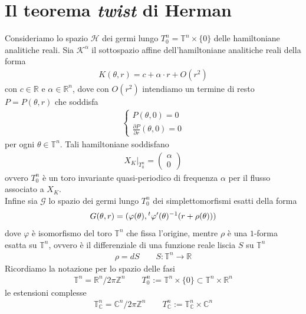 \documentclass[twoside, 11pt]{amsbook}
\newcommand{\0}{{(0)}}
\newcommand{\3}{{(3)}}
\theoremstyle{colonplain}
\theoremstyle{colondefinition}
\theoremstyle{colonremark}
\numberwithin{equation}{chapter}
\begin{document}
\section{Il teorema \textit{twist} di Herman}
Consideriamo lo spazio $\mathcal{H}$ dei germi lungo $T^n_0 = \mathbb{T}^n \times \{0\}$ delle hamiltoniane analitiche reali. Sia $\mathcal{K}^\alpha$ il sottospazio affine dell'hamiltoniane analitiche reali della forma
\begin{align}
    K(\theta, r) = c + \alpha \cdot r + O(r^2) 
\end{align}
con $c \in \mathbb{R}$ e $\alpha \in \mathbb{R}^n$, dove con $O(r^2)$ intendiamo un termine di resto $P = P(\theta, r)$ che soddisfa
\begin{align}
    \begin{cases}
        P(\theta, 0) = 0 \\
        \frac{\partial P}{\partial r}(\theta, 0) = 0
    \end{cases}
\end{align}
per ogni $\theta \in \mathbb{T}^n$. Tali hamiltoniane soddisfano
\begin{align}\label{HamVectFieldK}
    X_K|_{T^n_0} = \begin{pmatrix}
        \alpha \\
        0
    \end{pmatrix} 
\end{align}
ovvero $T^n_0$ è un toro invariante quasi-periodico di frequenza $\alpha$ per il flusso associato a $X_K$. \\
Infine sia $\mathcal{G}$ lo spazio dei germi lungo $T^n_0$ dei simplettomorfismi esatti della forma
\begin{align}\label{ExactSympl}
    G(\theta, r) = (\varphi(\theta), \null^t\varphi'(\theta)^{-1}(r + \rho(\theta)))
\end{align}
dove $\varphi$ è isomorfismo del toro $\mathbb{T}^n$ che fissa l'origine, mentre $\rho$ è una $1$-forma esatta su $\mathbb{T}^n$, ovvero è il differenziale di una funzione reale liscia $S$ su $\mathbb{T}^n$
\begin{align}
    \rho = dS \qquad S : \mathbb{T}^n \longrightarrow \mathbb{R}
\end{align}
Ricordiamo la notazione per lo spazio delle fasi
\begin{align}
    \mathbb{T}^n = \mathbb{R}^n/2\pi\mathbb{Z}^n \qquad T^n_0 := \mathbb{T}^n \times \{0\} \subset \mathbb{T}^n \times \mathbb{R}^n
\end{align}
le estensioni complesse
\begin{align}
    \mathbb{T}^n_\mathbb{C} = \mathbb{C}^n/2\pi\mathbb{Z}^n \qquad T^n_{\mathbb{C}} := \mathbb{T}^n_\mathbb{C} \times \mathbb{C}^n
\end{align}
\end{document}
